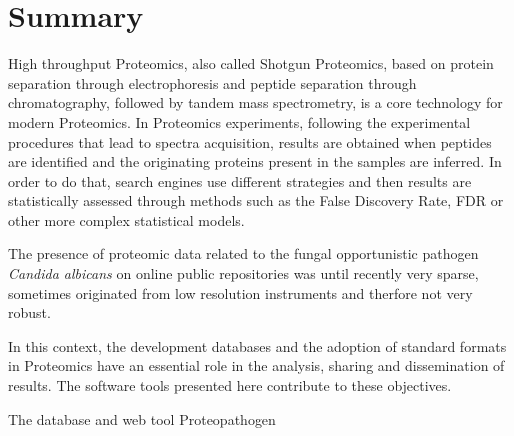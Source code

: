 %
%
%
%
%

\chapter{Summary}




High throughput Proteomics, also called Shotgun Proteomics,
based on protein separation through 
electrophoresis and peptide separation through chromatography, followed
by tandem mass spectrometry, is a core technology for modern Proteomics.
In Proteomics experiments, following the experimental procedures that
lead to spectra acquisition, results are obtained when peptides are 
identified and the originating proteins present in the samples are inferred.
In order to do that, search engines use different strategies and then
results are statistically assessed through methods such as the False
Discovery Rate, FDR or other more complex statistical models.

The presence of proteomic data related to the fungal opportunistic 
pathogen \textit{Candida albicans} on online public repositories was
until recently very sparse, sometimes originated from low resolution
instruments and therfore not very robust.

In this context, the development databases and the adoption
of standard formats in Proteomics have an essential role in the analysis,
sharing and dissemination of results. The software tools presented here 
contribute to these objectives.

The database and web tool Proteopathogen


\endinput
